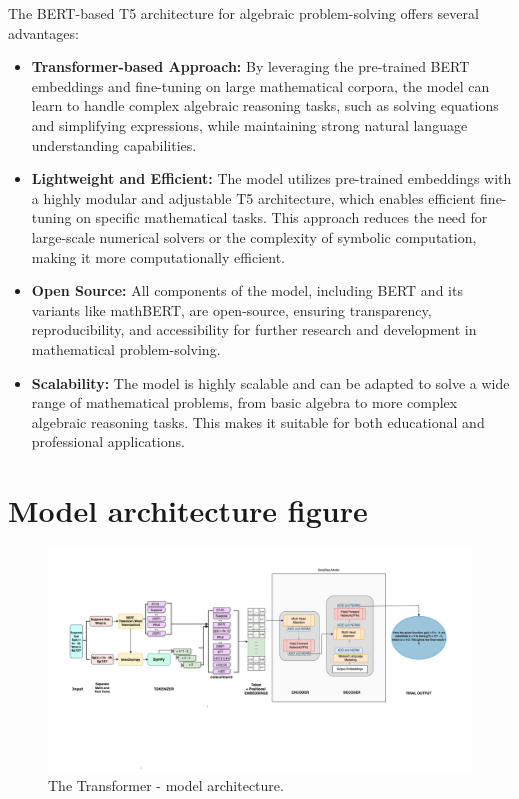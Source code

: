 \documentclass{article}
\begin{document}
The BERT-based T5 architecture for algebraic problem-solving offers several advantages:

\begin{itemize} \item \textbf{Transformer-based Approach:} By leveraging the pre-trained BERT embeddings and fine-tuning on large mathematical corpora, the model can learn to handle complex algebraic reasoning tasks, such as solving equations and simplifying expressions, while maintaining strong natural language understanding capabilities. \item \textbf{Lightweight and Efficient:} The model utilizes pre-trained embeddings with a highly modular and adjustable T5 architecture, which enables efficient fine-tuning on specific mathematical tasks. This approach reduces the need for large-scale numerical solvers or the complexity of symbolic computation, making it more computationally efficient. \item \textbf{Open Source:} All components of the model, including BERT and its variants like mathBERT, are open-source, ensuring transparency, reproducibility, and accessibility for further research and development in mathematical problem-solving. \item \textbf{Scalability:} The model is highly scalable and can be adapted to solve a wide range of mathematical problems, from basic algebra to more complex algebraic reasoning tasks. This makes it suitable for both educational and professional applications. \end{itemize}


\section{Model architecture figure}

\begin{figure}[H]
  \centering
  \includegraphics[width=\textwidth]{./figures/Model_architecture_figure.png}
  \caption{The Transformer - model architecture.}
  \label{fig:model-arch}
\end{figure}
\end{document}
